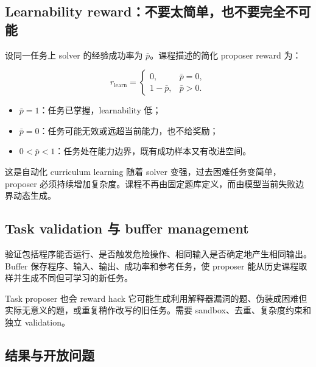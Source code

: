 \subsection{Learnability reward：不要太简单，也不要完全不可能}

设同一任务上 solver 的经验成功率为 $\bar p$。课程描述的简化 proposer reward 为：

$$
r_{\mathrm{learn}}=
\begin{cases}
0, & \bar p=0,\\
1-\bar p, & \bar p>0.
\end{cases}
$$

\begin{itemize}
    \item $\bar p=1$：任务已掌握，learnability 低；
    \item $\bar p=0$：任务可能无效或远超当前能力，也不给奖励；
    \item $0<\bar p<1$：任务处在能力边界，既有成功样本又有改进空间。
\end{itemize}

\begin{knowledgebox}{这是自动化 curriculum learning}
随着 solver 变强，过去困难任务变简单，proposer 必须持续增加复杂度。课程不再由固定题库定义，而由模型当前失败边界动态生成。
\end{knowledgebox}

\subsection{Task validation 与 buffer management}


验证包括程序能否运行、是否触发危险操作、相同输入是否确定地产生相同输出。Buffer 保存程序、输入、输出、成功率和参考任务，使 proposer 能从历史课程取样并生成不同但可学习的新任务。

\begin{warningbox}{Task proposer 也会 reward hack}
它可能生成利用解释器漏洞的题、伪装成困难但实际无意义的题，或重复稍作改写的旧任务。需要 sandbox、去重、复杂度约束和独立 validation。
\end{warningbox}

\subsection{结果与开放问题}

